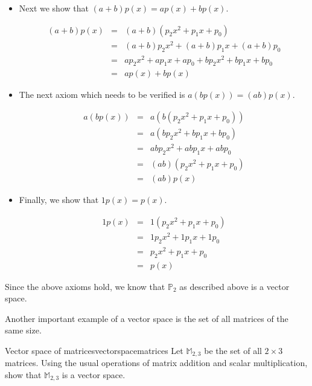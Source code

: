 \begin{solution}
\begin{itemize}
\item
Next we show that $(a+b) p(x) = ap(x) + bp(x)$. 

\begin{eqnarray*} 
(a+b) p(x) &=& (a+b) ( p_2x^2 + p_1x + p_0)\\
&=& (a+b)p_2x^2 + (a+b)p_1x + (a+b)p_0   \\
&=&  ap_2x^2 + ap_1x + ap_0 + bp_2x^2 +bp_1x + bp_0\\
&=& ap(x) + bp(x)
\end{eqnarray*}

\item
The next axiom which needs to be verified is $a(bp(x)) = (ab)p(x)$. 

\begin{eqnarray*}
a(bp(x)) &=& a \left(  b \left(p_2x^2 + p_1x +p_0\right)\right) \\
&=& a \left(  bp_2x^2 +bp_1x + bp_0 \right)\\
&=&  abp_2x^2 + abp_1x + abp_0 \\
&=& (ab) \left( p_2x^2 +p_1x + p_0 \right)\\
&=& (ab) p(x) 
\end{eqnarray*}

\item 
Finally, we show that $1p(x) = p(x)$. 

\begin{eqnarray*}
1p(x) &=& 1 \left(  p_2x^2  + p_1x +  p_0\right)\\
&=&  1p_2x^2 + 1p_1x + 1p_0\\
&=&  p_2x^2 + p_1x + p_0\\
&=& p(x)
\end{eqnarray*}

\end{itemize}

Since the above axioms hold, we know that $\mathbb{P}_2$ as described above is a vector space. 
\end{solution}

Another important example of a vector space is the set of all matrices of the same size. 

\begin{example}{Vector space of matrices}{vectorspacematrices}
Let $\mathbb{M}_{2,3}$ be the set of all $2 \times 3$ matrices. Using the usual operations of matrix addition and scalar multiplication, show that $\mathbb{M}_{2,3}$ is a vector space. 
\end{example}

